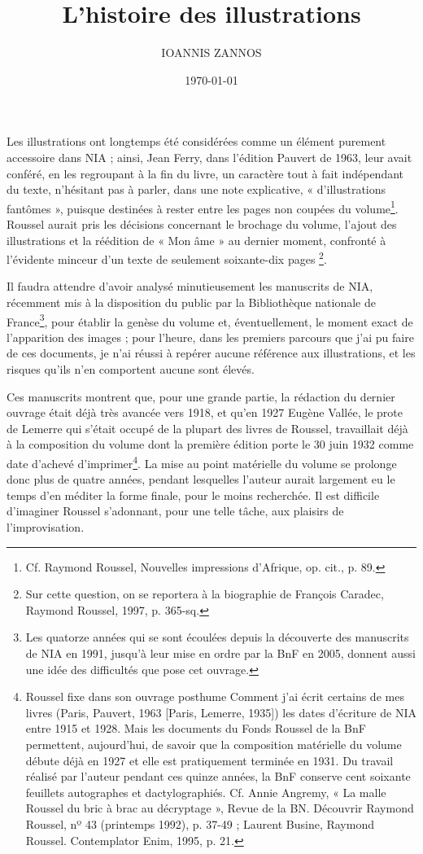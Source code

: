 \documentclass[nofonts]{tufte-handout}
\author{IOANNIS ZANNOS}
\date{\today}
\title{L’histoire des illustrations}
\begin{document}
\maketitle


Les illustrations ont longtemps été considérées comme un élément purement accessoire dans NIA ; ainsi, Jean Ferry, dans l’édition Pauvert de 1963, leur avait conféré, en les regroupant à la fin du livre, un caractère tout à fait indépendant du texte, n’hésitant pas à parler, dans une note explicative, « d’illustrations fantômes », puisque destinées à rester entre les pages non coupées du volume\footnote{Cf. Raymond Roussel, Nouvelles impressions d’Afrique, op. cit., p. 89.}. Roussel aurait pris les décisions concernant le brochage du volume, l’ajout des illustrations et la réédition de « Mon âme » au dernier moment, confronté à l’évidente minceur d’un texte de seulement soixante-dix pages \footnote{Sur cette question, on se reportera à la biographie de François Caradec, Raymond Roussel, 1997, p. 365-sq.}.

Il faudra attendre d’avoir analysé minutieusement les manuscrits de NIA, récemment mis à la disposition du public par la Bibliothèque nationale de France\footnote{Les quatorze années qui se sont écoulées depuis la découverte des manuscrits de NIA en 1991, jusqu’à leur mise en ordre par la BnF en 2005, donnent aussi une idée des difficultés que pose cet ouvrage.}, pour établir la genèse du volume et, éventuellement, le moment exact de l’apparition des images ; pour l’heure, dans les premiers parcours que j’ai pu faire de ces documents, je n’ai réussi à repérer aucune référence aux illustrations, et les risques qu’ils n’en comportent aucune sont élevés.


Ces manuscrits montrent que, pour une grande partie, la rédaction du dernier ouvrage était déjà très avancée vers 1918, et qu’en 1927 Eugène Vallée, le prote de Lemerre qui s’était occupé de la plupart des livres de Roussel, travaillait déjà à la composition du volume dont la première édition porte le 30 juin 1932 comme date d’achevé d’imprimer\footnote{Roussel fixe dans son ouvrage posthume Comment j’ai écrit certains de mes livres (Paris, Pauvert, 1963 [Paris, Lemerre, 1935]) les dates d’écriture de NIA entre 1915 et 1928. Mais les documents du Fonds Roussel de la BnF permettent, aujourd’hui, de savoir que la composition matérielle du volume débute déjà en 1927 et elle est pratiquement terminée en 1931. Du travail réalisé par l’auteur pendant ces quinze années, la BnF conserve cent soixante feuillets autographes et dactylographiés. Cf. Annie Angremy, « La malle Roussel du bric à brac au décryptage », Revue de la BN. Découvrir Raymond Roussel, nº 43 (printemps 1992), p. 37-49 ; Laurent Busine, Raymond Roussel. Contemplator Enim, 1995, p. 21.}. La mise au point matérielle du volume se prolonge donc plus de quatre années, pendant lesquelles l’auteur aurait largement eu le temps d’en méditer la forme finale, pour le moins recherchée. Il est difficile d’imaginer Roussel s’adonnant, pour une telle tâche, aux plaisirs de l’improvisation.
\end{document}
